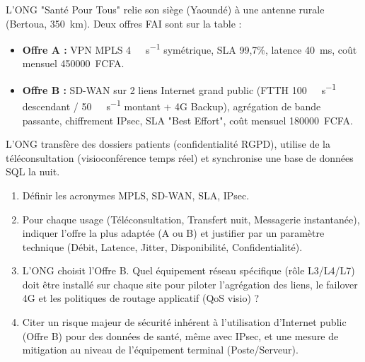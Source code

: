 \documentclass[11pt]{article}
\begin{document}
\begin{exercice}
L'ONG "Santé Pour Tous" relie son siège (Yaoundé) à une antenne rurale (Bertoua, \SI{350}{\kilo\metre}). Deux offres FAI sont sur la table :
\begin{itemize}
    \item \textbf{Offre A :} VPN MPLS \SI{4}{\mega\bit\per\second} symétrique, SLA 99,7\%, latence \SI{40}{\milli\second}, coût mensuel \SI{450000}{FCFA}.
    \item \textbf{Offre B :} SD-WAN sur 2 liens Internet grand public (FTTH \SI{100}{\mega\bit\per\second} descendant / \SI{50}{\mega\bit\per\second} montant + 4G Backup), agrégation de bande passante, chiffrement IPsec, SLA "Best Effort", coût mensuel \SI{180000}{FCFA}.
\end{itemize}
L'ONG transfère des dossiers patients (confidentialité RGPD), utilise de la téléconsultation (visioconférence temps réel) et synchronise une base de données SQL la nuit.
\begin{enumerate}
    \item Définir les acronymes MPLS, SD-WAN, SLA, IPsec.
    \item Pour chaque usage (Téléconsultation, Transfert nuit, Messagerie instantanée), indiquer l'offre la plus adaptée (A ou B) et justifier par un paramètre technique (Débit, Latence, Jitter, Disponibilité, Confidentialité).
    \item L'ONG choisit l'Offre B. Quel équipement réseau spécifique (rôle L3/L4/L7) doit être installé sur chaque site pour piloter l'agrégation des liens, le failover 4G et les politiques de routage applicatif (QoS visio) ?
    \item Citer un risque majeur de sécurité inhérent à l'utilisation d'Internet public (Offre B) pour des données de santé, même avec IPsec, et une mesure de mitigation au niveau de l'équipement terminal (Poste/Serveur).
\end{enumerate}
\end{exercice}
\end{document}
